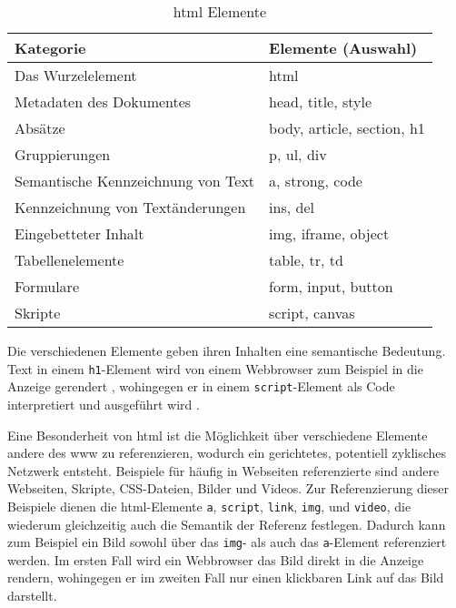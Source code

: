             \begin{table}[h]
                \centering
                \begin{tabular}{|l|l|}
                \hline
                \textbf{Kategorie} & \textbf{Elemente (Auswahl)} \\
                \hline
                Das Wurzelelement & html \\
                \hline
                Metadaten des Dokumentes & head, title, style \\
                \hline
                Absätze & body, article, section, h1 \\
                \hline
                Gruppierungen & p, ul, div \\
                \hline
                Semantische Kennzeichnung von Text & a, strong, code \\
                \hline
                Kennzeichnung von Textänderungen & ins, del \\
                \hline
                Eingebetteter Inhalt & img, iframe, object \\
                \hline
                Tabellenelemente & table, tr, td \\
                \hline
                Formulare & form, input, button \\
                \hline
                Skripte & script, canvas \\
                \hline
                \end{tabular}
                \caption{\gls{html} Elemente}
                \label{table:htmlElements}
            \end{table}

            Die verschiedenen Elemente geben ihren Inhalten eine semantische Bedeutung.
            Text in einem \texttt{h1}-Element wird von einem Webbrowser zum Beispiel in die Anzeige gerendert
            \cite[Kapitel 4.3.6]{w3c:html5},
            wohingegen er in einem \texttt{script}-Element als Code interpretiert und ausgeführt wird
            \cite[Kapitel 4.11.1]{w3c:html5}.
        
            Eine Besonderheit von \gls{html} ist die Möglichkeit
            über verschiedene Elemente andere {\resources} des \gls{www} zu referenzieren,
            wodurch ein gerichtetes, potentiell zyklisches Netzwerk entsteht.
            Beispiele für häufig in Webseiten referenzierte {\resources}
            sind andere Webseiten, Skripte, CSS-Dateien, Bilder und Videos.
            Zur Referenzierung dieser Beispiele dienen die \gls{html}-Elemente
            \texttt{a}, \texttt{script}, \texttt{link}, \texttt{img}, und \texttt{video},
            die wiederum gleichzeitig auch die Semantik der Referenz festlegen.
            Dadurch kann zum Beispiel ein Bild sowohl über das \texttt{img}-
            als auch das \texttt{a}-Element referenziert werden.
            Im ersten Fall wird ein Webbrowser das Bild direkt in die Anzeige rendern,
            wohingegen er im zweiten Fall nur einen klickbaren Link auf das Bild darstellt.

